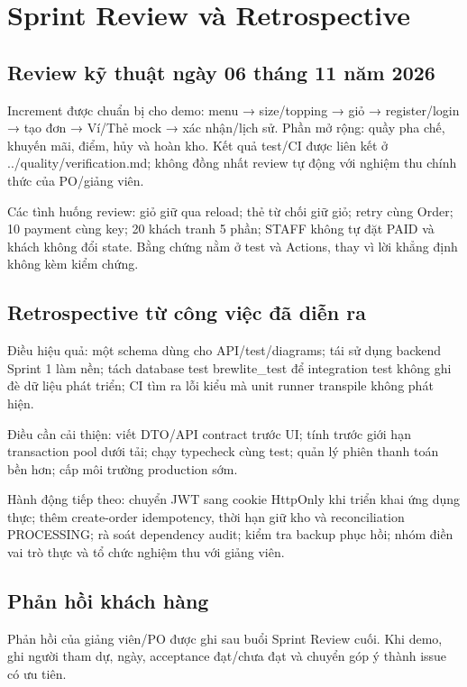 \documentclass[a4paper,12pt,oneside]{report}
\begin{document}
\section{Sprint Review và Retrospective}

\subsection{Review kỹ thuật ngày 06 tháng 11 năm 2026}
Increment được chuẩn bị cho demo: menu → size/\allowbreak{}topping → giỏ → register/\allowbreak{}login → tạo đơn → Ví/\allowbreak{}Thẻ mock → xác nhận/\allowbreak{}lịch sử. Phần mở rộng: quầy pha chế, khuyến mãi, điểm, hủy và hoàn kho. Kết quả test/\allowbreak{}CI được liên kết ở {\small\ttfamily .\allowbreak{}.\allowbreak{}/\allowbreak{}quality/\allowbreak{}verification.\allowbreak{}md}; không đồng nhất review tự động với nghiệm thu chính thức của PO/\allowbreak{}giảng viên.


Các tình huống review: giỏ giữ qua reload; thẻ từ chối giữ giỏ; retry cùng Order; 10 payment cùng key; 20 khách tranh 5 phần; STAFF không tự đặt PAID và khách không đổi state. Bằng chứng nằm ở test và Actions, thay vì lời khẳng định không kèm kiểm chứng.


\subsection{Retrospective từ công việc đã diễn ra}
Điều hiệu quả: một schema dùng cho API/\allowbreak{}test/\allowbreak{}diagrams; tái sử dụng backend Sprint 1 làm nền; tách database test {\small\ttfamily brewlite\_\allowbreak{}test} để integration test không ghi đè dữ liệu phát triển; CI tìm ra lỗi kiểu mà unit runner transpile không phát hiện.


Điều cần cải thiện: viết DTO/\allowbreak{}API contract trước UI; tính trước giới hạn transaction pool dưới tải; chạy typecheck cùng test; quản lý phiên thanh toán bền hơn; cấp môi trường production sớm.


Hành động tiếp theo: chuyển JWT sang cookie HttpOnly khi triển khai ứng dụng thực; thêm create-order idempotency, thời hạn giữ kho và reconciliation PROCESSING; rà soát dependency audit; kiểm tra backup phục hồi; nhóm điền vai trò thực và tổ chức nghiệm thu với giảng viên.


\subsection{Phản hồi khách hàng}
Phản hồi của giảng viên/\allowbreak{}PO được ghi sau buổi Sprint Review cuối. Khi demo, ghi người tham dự, ngày, acceptance đạt/\allowbreak{}chưa đạt và chuyển góp ý thành issue có ưu tiên.
\end{document}
